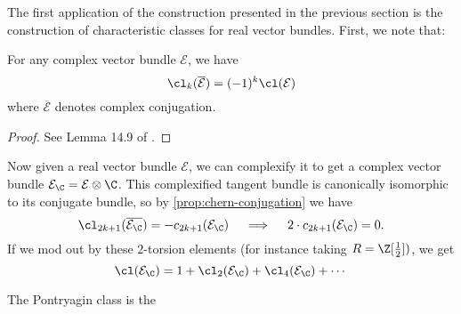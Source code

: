 The first application of the construction presented in the previous section is the construction of characteristic classes for real vector bundles. First, we note that:
\begin{proposition}\label{prop:chern-conjugation}
	For any complex vector bundle $\mathcal{E}$, we have
	\[
		\cl_k(\overline{\mathcal{E}}) = (-1)^k\cl(\mathcal{E})
	\]
	where $\overline{\mathcal{E}}$ denotes complex conjugation.
\end{proposition}
\begin{proof}
	See Lemma 14.9 of \cite{milnorstasheff1974}.
\end{proof}

Now given a real vector bundle $\mathcal{E}$, we can complexify it to get a complex vector bundle $\mathcal{E}_\C = \mathcal{E}\otimes \C$. This complexified tangent bundle is canonically isomorphic to its conjugate bundle, so by \cref{prop:chern-conjugation} we have
\[
	\cl_{2k+1}(\overline{\mathcal{E}_\C}) = -c_{2k+1}(\mathcal{E}_\C) \quad\implies\quad 2\cdot c_{2k+1}(\mathcal{E}_\C) = 0.
\]
If we mod out by these $2$-torsion elements (for instance taking $R=\Z[\frac{1}{2}])$, we get
\[
	\cl(\mathcal{E}_\C) = 1+\cl_2(\mathcal{E}_\C) + \cl_4(\mathcal{E}_\C)+\cdots
\]
\begin{definition}
	The Pontryagin class is the 
\end{definition}

%
%

